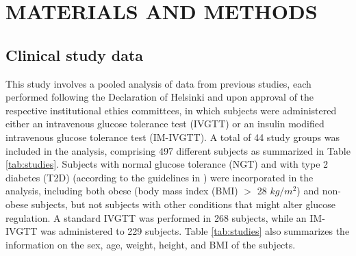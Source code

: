 \documentclass[utf8]{frontiersSCNS} %
\begin{document}
\vskip 0.5cm
\section{MATERIALS AND METHODS}
\vskip 0.5cm
\subsection{Clinical study data}
This study involves a pooled analysis of data from previous studies, each performed following the Declaration of Helsinki and upon approval of the respective institutional ethics committees, in which subjects were administered either an intravenous glucose tolerance test (IVGTT) or an insulin modified intravenous glucose tolerance test (IM-IVGTT). A total of 44 study groups was included in the analysis, comprising 497 different subjects as summarized in Table \ref{tab:studies}. Subjects with normal glucose tolerance (NGT) and with type 2 diabetes (T2D) (according to the guidelines in \citet{t2dm_class}) were incorporated in the analysis, including both obese (body mass index (BMI) $>$ 28 $kg/m^2$) and non-obese subjects, but not subjects with other conditions that might alter glucose regulation. A standard IVGTT was performed in 268 subjects, while an IM-IVGTT was administered to 229 subjects. Table \ref{tab:studies} also summarizes the information on the sex, age, weight, height, and BMI of the subjects.
\end{document}
